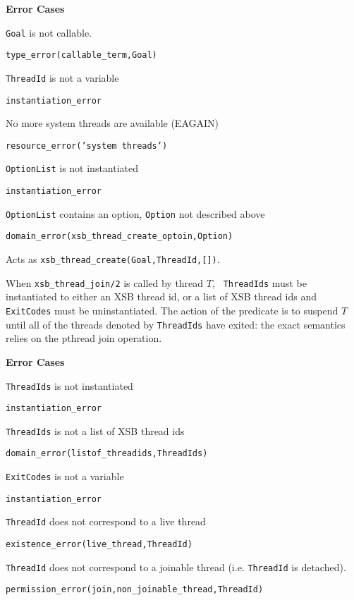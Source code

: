 \begin{description}
{\bf Error Cases}
\bi
\item 	{\tt Goal} is not callable.
\bi
\item 	{\tt type\_error(callable\_term,Goal)}
\ei
\item 	{\tt ThreadId} is not a variable
\bi
\item 	{\tt instantiation\_error}
\ei
\item   No more system threads are available (EAGAIN)
\bi
\item {\tt resource\_error('system threads')}
\ei
\item 	{\tt OptionList} is not instantiated
\bi
\item 	{\tt instantiation\_error}
\ei
\item 	{\tt OptionList} contains an option, {\tt Option} not described above
\bi
\item 	{\tt domain\_error(xsb\_thread\_create\_optoin,Option)}
\ei
\ei

%
Acts as {\tt xsb\_thread\_create(Goal,ThreadId,[])}.

% 
When {\tt xsb\_thread\_join/2} is called by thread $T$, {\tt
  ThreadIds} must be instantiated to either an XSB thread id, or a
list of XSB thread ids and {\tt ExitCodes} must be uninstantiated.
The action of the predicate is to suspend $T$ until all of the threads
denoted by {\tt ThreadIds} have exited: the exact semantics relies on
the {\sc pthread} join operation.

{\bf Error Cases}
\bi
\item 	{\tt ThreadIds} is not instantiated
\bi
\item 	{\tt instantiation\_error}
\ei
%
\item 	{\tt ThreadIds} is not a list of XSB thread ids
\bi
\item 	{\tt domain\_error(listof\_threadids,ThreadIds)}
\ei
%
\item 	{\tt ExitCodes} is not a variable
\bi
\item 	{\tt instantiation\_error}
\ei
%
\item   {\tt ThreadId} does not correspond to a live thread
\bi
\item   {\tt existence\_error(live\_thread,ThreadId)}
\ei
\item   {\tt ThreadId} does not correspond to a joinable thread
  (i.e. {\tt ThreadId} is detached).
\bi
\item   {\tt permission\_error(join,non\_joinable\_thread,ThreadId)}
\ei
\ei


\end{description}
